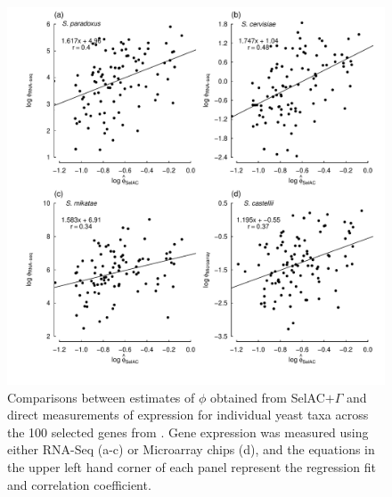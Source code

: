 \documentclass{article}
\newcommand{\selacplusgamma}{SelAC$+\Gamma$\xspace}
\begin{document}
\begin{figure}[H]
  \centering
  \includegraphics[width=0.9\linewidth]{FIGURE_1_SelACwG_vs_Empirical_by_spp.pdf}
  \caption{Comparisons between estimates of $\phi$ obtained from \selacplusgamma and direct measurements of expression for individual yeast taxa across the 100 selected genes from \citet{SalichosAndRokas2013}.
  	Gene expression was measured using either RNA-Seq (a-c) or Microarray chips (d), and the equations in the upper left hand corner of each panel represent the regression fit and correlation coefficient.
  } 
  \label{fig:PhivsEmpirical}
\end{figure}
\end{document}
